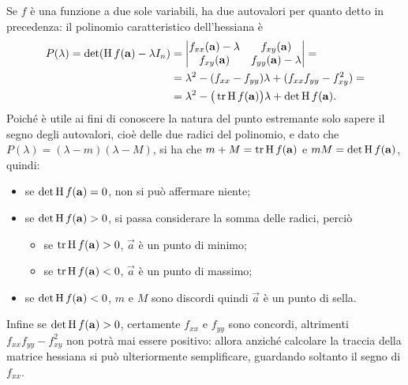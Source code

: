 Se $f$ è una funzione a due sole variabili, ha due autovalori per quanto detto in precedenza: il polinomio caratteristico dell'hessiana è
\begin{equation}\begin{split}
P(\lambda)=\det(\operatorname{H} f(\mathbf{a})-\lambda I_n)	&=\begin{vmatrix}f_{xx}(\mathbf{a})-\lambda&f_{xy}(\mathbf{a})\\f_{xy}(\mathbf{a})&f_{yy}(\mathbf{a})-\lambda\end{vmatrix}=\\
										&=\lambda^2-(f_{xx}-f_{yy})\lambda+(f_{xx}f_{yy}-f_{xy}^2)=\\
										&=\lambda^2-\big(\operatorname{tr}\operatorname{H} f(\mathbf{a})\big)\lambda+\det\operatorname{H} f(\mathbf{a}).
\end{split}\end{equation}
Poiché è utile ai fini di conoscere la natura del punto estremante solo sapere il segno degli autovalori, cioè delle due radici del polinomio, e dato che $P(\lambda)=(\lambda-m)(\lambda-M)$, si ha che $m+M=\operatorname{tr}\operatorname{H} f(\mathbf{a})$ e $mM=\det\operatorname{H} f(\mathbf{a})$, quindi:
\begin{itemize}
\item se $\det\operatorname{H} f(\mathbf{a})=0$, non si può affermare niente;
\item se $\det\operatorname{H} f(\mathbf{a})>0$, si passa considerare la somma delle radici, perciò
	\begin{itemize}
	\item se $\operatorname{tr}\operatorname{H} f(\mathbf{a})>0$, $\vec a$ è un punto di minimo;
	\item se $\operatorname{tr}\operatorname{H} f(\mathbf{a})<0$, $\vec a$ è un punto di massimo;
	\end{itemize}
\item se $\det\operatorname{H} f(\mathbf{a})<0$, $m$ e $M$ sono discordi quindi $\vec a$ è un punto di sella.
\end{itemize}
Infine se $\det\operatorname{H} f(\mathbf{a})>0$, certamente $f_{xx}$ e $f_{yy}$ sono concordi, altrimenti $f_{xx}f_{yy}-f_{xy}^2$ non potrà mai essere positivo: allora anziché calcolare la traccia della matrice hessiana si può ulteriormente semplificare, guardando soltanto il segno di $f_{xx}$.
